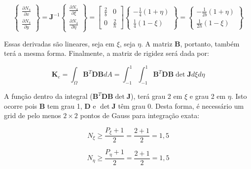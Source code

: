     \begin{equation}
        \begin{Bmatrix}
            \frac{\partial N_4}{\partial x} \\
            \frac{\partial N_4}{\partial y}
        \end{Bmatrix} = 
        \mathbf{J}^{-1}
        \begin{Bmatrix}
            \frac{\partial N_4}{\partial \xi} \\
            \frac{\partial N_4}{\partial \eta}
        \end{Bmatrix}=
        \begin{bmatrix}
                \frac{2}{b} &  0\\
                0 &  \frac{2}{h}
        \end{bmatrix}
        \begin{Bmatrix}
            -\frac{1}{4}\left(1+\eta\right) \\
            \frac{1}{4}\left(1-\xi\right)
        \end{Bmatrix}=
        \begin{Bmatrix}
            -\frac{1}{2b}\left(1+\eta\right) \\
            \frac{1}{2h}\left(1-\xi\right)
        \end{Bmatrix}
    \end{equation}

    Essas derivadas são lineares, seja em $\xi$, seja $\eta$. A matriz $\bm{B}$, portanto, também terá a mesma forma. Finalmente, a matriz de rigidez será dada por:

    \begin{equation}
        \mathbf{K}_e = \int_\Omega  \mathbf{B}^T \mathbf{D} \mathbf{B} dA = \int_{-1}^{1} \int_{-1}^{1}  \mathbf{B}^T \mathbf{D} \mathbf{B} \det \mathbf{J} d\xi d\eta
    \end{equation}

    A função dentro da integral ($\mathbf{B}^T \mathbf{D} \mathbf{B} \det \mathbf{J}$), terá grau 2 em $\xi$ e grau 2 em $\eta$. Isto ocorre pois $\bm{B}$ tem grau 1, $\bm{D}$ e $ \det \mathbf{J}$ têm grau 0. Desta forma, é necessário um grid de pelo menos $2 \times 2$ pontos de Gauss para integração exata:

    \begin{equation}
        N_\xi \geq \frac{P_\xi+1}{2} = \frac{2+1}{2} = 1,5
    \end{equation}

    \begin{equation}
        N_\eta \geq \frac{P_\eta+1}{2} = \frac{2+1}{2} = 1,5
    \end{equation}

